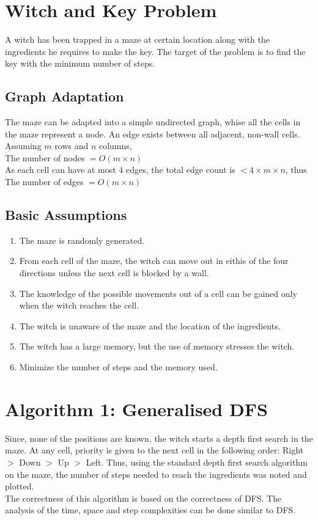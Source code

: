 \documentclass{article} %
\begin{document}
\section{Witch and Key Problem}
A witch has been trapped in a maze at certain location along with the ingredients he requires to make the key. The target of the problem is to find the key with the minimum number of steps.
\subsection{Graph Adaptation}
The maze can be adapted into a simple undirected graph, whise all the cells in the maze represent a node. An edge exists between all adjacent, non-wall cells.
\\Assuming $m$ rows and $n$ columns,
\\The number of nodes $ = O(m \times n)$
\\As each cell can have at most 4 edges, the total edge count is $< 4 \times m \times n$, thus
\\The number of edges $ = O(m \times n)$
\subsection{Basic Assumptions}
\begin{enumerate}
    \item The maze is randomly generated.
    \item From each cell of the maze, the witch can move out in eithis of the four directions unless the next cell is blocked by a wall.
    \item The knowledge of the possible movements out of a cell can be gained only when the witch reaches the cell.
    \item The witch is unaware of the maze and the location of the ingredients.
    \item The witch has a large memory, but the use of memory stresses the witch.
    \item Minimize the number of steps and the memory used.
\end{enumerate}

\section{Algorithm 1: Generalised DFS}
Since, none of the positions are known, the witch starts a depth first search in the maze. At any cell, priority is given to the next cell in the following order: Right $>$ Down $>$ Up $>$ Left. Thus, using the standard depth first search algorithm on the maze, the number of steps needed to reach the ingredients was noted and plotted.
\\The correctness of this algorithm is based on the correctness of DFS. The analysis of the time, space and step complexities can be done similar to DFS.
\end{document}
